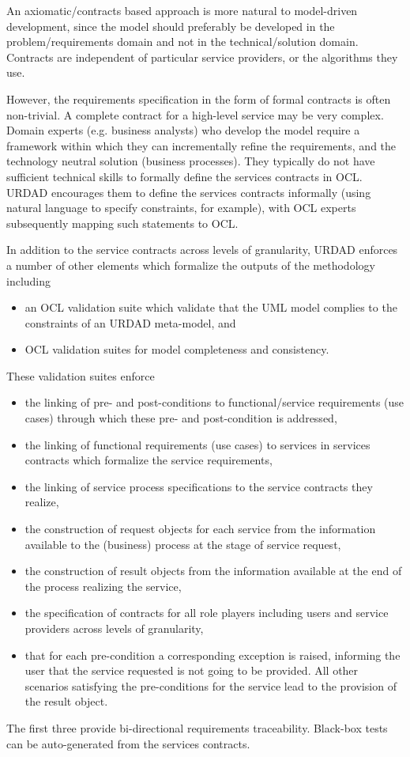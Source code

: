 An axiomatic/contracts based approach is more natural to model-driven development, since the
model should preferably be developed in the problem/requirements domain and not in the
technical/solution domain. Contracts are independent of particular service providers, or the algorithms they use.

However, the requirements specification in the form of formal contracts is often non-trivial. A complete contract for a high-level service may be very complex. Domain
experts (e.g. business analysts) who develop the model require a framework within which they can incrementally
refine the requirements, and the technology neutral solution (business processes). They typically do not have sufficient technical skills to formally define the services
contracts in OCL. URDAD encourages them to define the
services contracts informally (using natural language to specify constraints, for example), with OCL experts subsequently mapping such statements to OCL. 

In addition to the service contracts across levels of granularity, URDAD enforces a number
of other elements which formalize the outputs of the methodology including
\begin{itemize}
  \item an OCL validation suite which validate that the UML model complies to the
			constraints of an URDAD meta-model, and
  \item OCL validation suites for model completeness and consistency.
\end{itemize}

These validation suites enforce
\begin{itemize}
  \item the linking of pre- and post-conditions to functional/service
			requirements (use cases) through which these pre- and post-condition is
			addressed,
	\item the linking of functional requirements (use cases) to services
			in services contracts which formalize the service requirements,
	\item the linking of service process specifications to the service contracts they realize,
	\item the construction of request objects for each service
			from the information available to the (business) process at the
			stage of service request,
	\item the construction of result objects from the information available
			at the end of the process realizing the service,
	\item the specification of contracts for all role players
			including users and service providers across levels of granularity,
	\item that for each pre-condition a corresponding exception is raised,
			informing the user that the service requested is not going to be provided.
			All other scenarios satisfying the pre-conditions for the service
			lead to the provision of the result object.
\end{itemize}
The first three provide bi-directional requirements traceability. Black-box
tests can be auto-generated from the services contracts.


